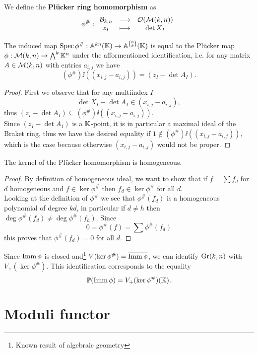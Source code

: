\begin{definition}
We define the \textbf{Pl\"ucker ring homomorphism} as
\[\phi^\#:\begin{array}{ccc} {\mathcal{B}_{k,n}} & \longrightarrow & {\mathcal{O}(\mathcal{M}(k,n))}\\ {z_I} & \longmapsto & {\det X_I} \end{array}\]
\end{definition}

\begin{proposition}\label{PluckerRingHomomorphismWorksForKPoints}
The induced map $\mathrm{Spec}\, \phi^\#:\mathbb{A}^{kn}(\mathbb{K})\to \mathbb{A}^{\binom nk}(\mathbb{K})$ is equal to the Pl\"ucker map $\phi:\mathcal{M}(k,n)\to \bigwedge^k\mathbb{K}^n$ under the afformentioned identification, i.e. for any matrix $A\in\mathcal{M}(k,n)$ with entries $a_{i,j}$ we have
\[(\phi^\#)\ii((x_{i,j}-a_{i,j}))=(z_I-\det A_I).\]
\end{proposition}
\begin{proof}
First we observe that for any multiindex $I$
\[\det X_I-\det A_I\in (x_{i,j}-a_{i,j}),\]
thus $(z_I-\det A_I)\subseteq (\phi^\#)\ii((x_{i,j}-a_{i,j}))$.\\
Since $(z_I-\det A_I)$ is a $\mathbb{K}$-point, it is in particular a maximal ideal of the Braket ring, thus we have the desired equality if $1\notin (\phi^\#)\ii((x_{i,j}-a_{i,j}))$, which is the case because otherwise $(x_{i,j}-a_{i,j})$ would not be proper.
\end{proof}

\begin{lemma}
The kernel of the Pl\"ucker homomorphism is homogeneous.
\end{lemma}
\begin{proof}
By definition of homogeneous ideal, we want to show that if $f=\sum f_d$ for $d$ homogeneous and $f\in \ker\phi^\#$ then $f_d\in \ker \phi^\#$ for all $d$.\\
Looking at the definition of $\phi^\#$ we see that $\phi^\#(f_d)$ is a homogeneous polynomial of degree $kd$, in particular if $d\neq h$ then $\deg \phi^\#(f_d)\neq \deg \phi^\#(f_h)$. Since
\[0=\phi^\#(f)=\sum \phi^\#(f_d)\]
this proves that $\phi^\#(f_d)=0$ for all $d$.
\end{proof}

Since $\mathrm{Imm}\, \phi$ is closed and\footnote{Known result of algebraic geometry} $V(\ker\phi^\#)=\overline{\mathrm{Imm}\, \phi}$, we can identify $\mathrm{Gr}(k,n)$ with $V_+(\ker \phi^\#)$. This identification corresponds to the equality \[\mathbb{P}(\mathrm{Imm}\, \phi)=V_+(\ker \phi^\#)(\mathbb{K}).\]


\section{Moduli functor}

